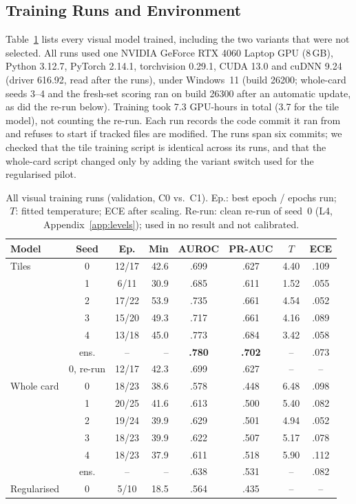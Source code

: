 \documentclass[conference]{IEEEtran}
\begin{document}
\subsection{Training Runs and Environment}

Table~\ref{tab:runs} lists every visual model trained, including the
two variants that were not selected. All runs used one NVIDIA GeForce
RTX 4060 Laptop GPU (8\,GB), Python 3.12.7, PyTorch 2.14.1,
torchvision 0.29.1, CUDA 13.0 and cuDNN 9.24 (driver 616.92, read
after the runs), under Windows~11 (build
26200; whole-card seeds 3--4 and the fresh-set scoring ran on build
26300 after an automatic update, as did the re-run below). Training
took 7.3 GPU-hours in total (3.7 for the tile model), not counting the
re-run. Each run records the code commit it ran from
and refuses to start if tracked files are modified. The runs span six
commits; we checked that the tile training script is identical across
its runs, and that the whole-card script changed only by adding the
variant switch used for the regularised pilot.

\begin{table}[!t]
\caption{All visual training runs (validation, C0 vs.\ C1). Ep.: best
epoch / epochs run; $T$: fitted temperature; ECE after scaling.
Re-run: clean re-run of seed~0 (L4, Appendix~\ref{app:levels}); used in no
result and not calibrated.}
\label{tab:runs}
\centering
\scriptsize
\setlength{\tabcolsep}{2.6pt}
\renewcommand{\arraystretch}{1.08}
\begin{tabular}{@{}l c c r c c c c@{}}
\toprule
Model & Seed & Ep. & Min & AUROC & PR-AUC & $T$ & ECE \\
\midrule
Tiles & 0 & 12/17 & 42.6 & .699 & .627 & 4.40 & .109 \\
      & 1 & \hphantom{0}6/11 & 30.9 & .685 & .611 & 1.52 & .055 \\
      & 2 & 17/22 & 53.9 & .735 & .661 & 4.54 & .052 \\
      & 3 & 15/20 & 49.3 & .717 & .661 & 4.16 & .089 \\
      & 4 & 13/18 & 45.0 & .773 & .684 & 3.42 & .058 \\
      & ens. & -- & -- & \textbf{.780} & \textbf{.702} & -- & .073 \\
      & 0, re-run & 12/17 & 42.3 & .699 & .627 & -- & -- \\
\midrule
Whole card & 0 & 18/23 & 38.6 & .578 & .448 & 6.48 & .098 \\
           & 1 & 20/25 & 41.6 & .613 & .500 & 5.40 & .082 \\
           & 2 & 19/24 & 39.9 & .629 & .501 & 4.94 & .052 \\
           & 3 & 18/23 & 39.9 & .622 & .507 & 5.17 & .078 \\
           & 4 & 18/23 & 37.9 & .611 & .518 & 5.90 & .112 \\
           & ens. & -- & -- & .638 & .531 & -- & .082 \\
\midrule
Regularised & 0 & \hphantom{0}5/10 & 18.5 & .564 & .435 & -- & -- \\
\bottomrule
\end{tabular}
\end{table}
\end{document}
